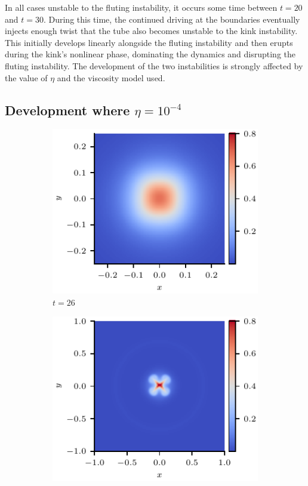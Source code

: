 \documentclass[12pt]{article}
\begin{document}
In all cases unstable to the fluting instability, it occurs some time between $t=20$ and $t=30$. During this time, the continued driving at the boundaries eventually injects enough twist that the tube also becomes unstable to the kink instability. This initially develops linearly alongside the fluting instability and then erupts during the kink's nonlinear phase, dominating the dynamics and disrupting the fluting instability. The development of the two instabilities is strongly affected by the value of $\eta$ and the viscosity model used.

\subsection{Development where $\eta=10^{-4}$}

\begin{figure}[t]
  \centering
    \begin{subfigure}{0.32\textwidth}
      \includegraphics[width=\linewidth]{swi-4_pressure_13.pdf}
      \caption{$t=26$}
      \label{fig:swi-4_pressure_13}
    \end{subfigure}
    \hfill
    \begin{subfigure}{0.32\textwidth}
      \includegraphics[width=\linewidth]{swi-4_pressure_14.pdf}

\end{subfigure}
\end{figure}
\end{document}
